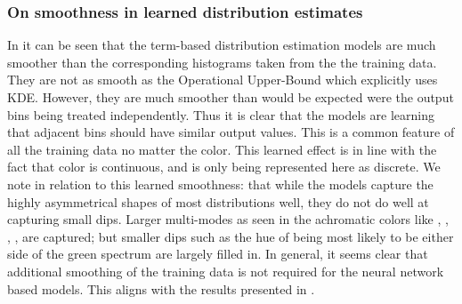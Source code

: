 \documentclass[11pt,a4paper]{article}
\begin{document}
\subsubsection{On smoothness in learned distribution estimates}\label{sec:learnedsmoothness}
In  it can be seen that the term-based distribution estimation models are much smoother than the corresponding histograms taken from the the training data.
They are not as smooth as the Operational Upper-Bound which explicitly uses KDE.
However, they are much smoother than would be expected were the output bins being treated independently.
Thus it is clear that the models are learning that adjacent bins should have similar output values.
This is a common feature of all the training data no matter the color.
This learned effect is in line with the fact that color is continuous, and is only being represented here as discrete.
We note in relation to this learned smoothness: that while the models capture the highly asymmetrical shapes of most distributions well, they do not do well at capturing small dips.
Larger multi-modes as seen in the achromatic colors like , , , , are captured; but smaller dips such as the hue of  being most likely to be either side of the green spectrum are largely filled in.
In general, it seems clear that additional smoothing of the training data is not required for the neural network based models.
This aligns with the results presented in .




\end{document}
